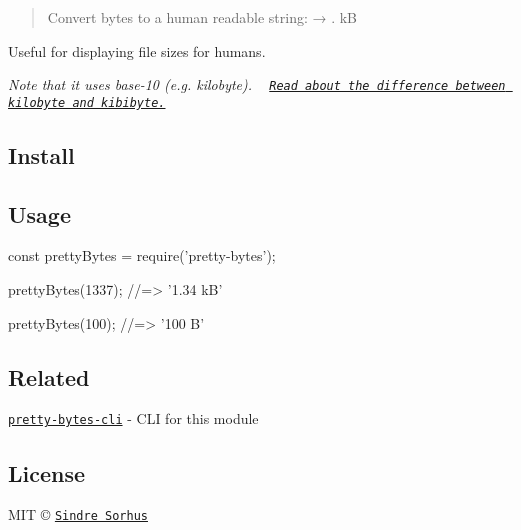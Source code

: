 \begin{quote}
Convert bytes to a human readable string\+: {} → {. kB} \end{quote}


Useful for displaying file sizes for humans.


\begin{DoxyItemize}
\item {\itshape Note that it uses base-\/10 (e.\+g. kilobyte). ~\newline
\href{http://pacoup.com/2009/05/26/kb-kb-kib-whats-up-with-that/}{\tt Read about the difference between kilobyte and kibibyte.}}
\end{DoxyItemize}

\subsection*{Install}




\subsection*{Usage}


\begin{DoxyCode}
const prettyBytes = require('pretty-bytes');

prettyBytes(1337);
//=> '1.34 kB'

prettyBytes(100);
//=> '100 B'
\end{DoxyCode}


\subsection*{Related}


\begin{DoxyItemize}
\item \href{https://github.com/sindresorhus/pretty-bytes-cli}{\tt pretty-\/bytes-\/cli} -\/ C\+LI for this module
\end{DoxyItemize}

\subsection*{License}

M\+IT © \href{https://sindresorhus.com}{\tt Sindre Sorhus} 